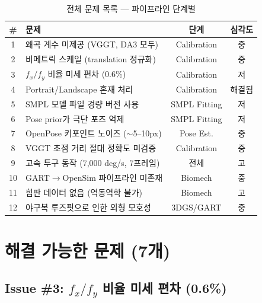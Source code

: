 \documentclass[11pt, a4paper]{report}
\begin{document}
\begin{table}[H]
\centering
\caption{전체 문제 목록 --- 파이프라인 단계별}
\renewcommand{\arraystretch}{1.4}
\small
\begin{tabular}{c p{6.5cm} c c}
\toprule
\textbf{\#} & \textbf{문제} & \textbf{단계} & \textbf{심각도} \\
\midrule
1 & 왜곡 계수 미제공 (VGGT, DA3 모두) & Calibration & \textcolor{partial}{중} \\
2 & 비메트릭 스케일 (translation 정규화) & Calibration & \textcolor{partial}{중} \\
3 & $f_x/f_y$ 비율 미세 편차 (0.6\%) & Calibration & \textcolor{solvable}{저} \\
4 & Portrait/Landscape 혼재 처리 & Calibration & \textcolor{solvable}{해결됨} \\
5 & SMPL 모델 파일 경량 버전 사용 & SMPL Fitting & \textcolor{solvable}{저} \\
6 & Pose prior가 극단 포즈 억제 & SMPL Fitting & \textcolor{solvable}{저} \\
7 & OpenPose 키포인트 노이즈 ($\sim$5--10px) & Pose Est. & \textcolor{partial}{중} \\
8 & VGGT 초점 거리 절대 정확도 미검증 & Calibration & \textcolor{partial}{중} \\
9 & 고속 투구 동작 (7,000 deg/s, 7프레임) & 전체 & \textcolor{hard}{고} \\
10 & GART$\rightarrow$OpenSim 파이프라인 미존재 & Biomech & \textcolor{partial}{중} \\
11 & 힘판 데이터 없음 (역동역학 불가) & Biomech & \textcolor{hard}{고} \\
12 & 야구복 루즈핏으로 인한 외형 모호성 & 3DGS/GART & \textcolor{partial}{중} \\
\bottomrule
\end{tabular}
\end{table}


\chapter{해결 가능한 문제 (7개)}
\label{ch:solvable}


\section{Issue \#3: $f_x/f_y$ 비율 미세 편차 (0.6\%)}
\end{document}
